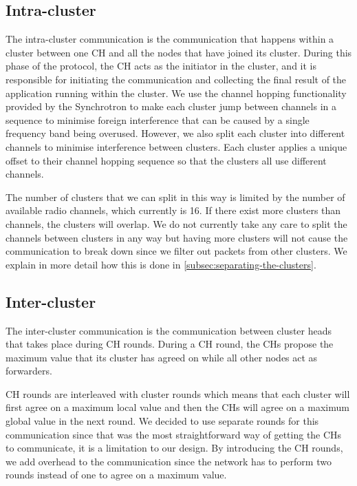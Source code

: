 \subsection{Intra-cluster}
The intra-cluster communication is the communication that happens within a cluster between one CH and all the nodes that have joined its cluster. During this phase of the protocol, the CH acts as the initiator in the cluster, and it is responsible for initiating the communication and collecting the final result of the application running within the cluster. We use the channel hopping functionality provided by the \atwo{} Synchrotron \cite{a2-introduction-paper} to make each cluster jump between channels in a sequence to minimise foreign interference that can be caused by a single frequency band being overused. However, we also split each cluster into different channels to minimise interference between clusters. Each cluster applies a unique offset to their channel hopping sequence so that the clusters all use different channels.

The number of clusters that we can split in this way is limited by the number of available radio channels, which currently is 16. If there exist more clusters than channels, the clusters will overlap. We do not currently take any care to split the channels between clusters in any way but having more clusters will not cause the communication to break down since we filter out packets from other clusters. We explain in more detail how this is done in \cref{subsec:separating-the-clusters}.


\subsection{Inter-cluster}
The inter-cluster communication is the communication between cluster heads that takes place during CH rounds. During a CH round, the CHs propose the maximum value that its cluster has agreed on while all other nodes act as forwarders.

CH rounds are interleaved with cluster rounds which means that each cluster will first agree on a maximum local value and then the CHs will agree on a maximum global value in the next round. We decided to use separate rounds for this communication since that was the most straightforward way of getting the CHs to communicate, it is a limitation to our design. By introducing the CH rounds, we add overhead to the communication since the network has to perform two rounds instead of one to agree on a maximum value.

